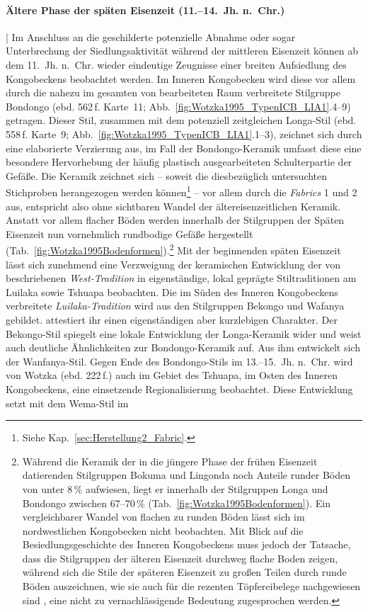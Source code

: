 \paragraph{Ältere Phase der späten Eisenzeit (11.--14.~Jh. n.~Chr.)}\hspace{-.5em}|\hspace{.5em}%
Im Anschluss an die geschilderte potenzielle Abnahme oder sogar Unterbrechung der Siedlungsaktivität während der mittleren Eisenzeit können ab dem 11.~Jh. n.~Chr. wieder eindeutige Zeugnisse einer breiten Aufsiedlung des Kongobeckens beobachtet werden. Im Inneren Kongobecken wird diese vor allem durch die nahezu im gesamten von \textcite{Wotzka.1995} bearbeiteten Raum verbreitete Stilgruppe Bondongo (ebd. 562\,f. Karte~11; Abb.~\ref{fig:Wotzka1995_TypenICB_LIA1}.4--9) getragen. Dieser Stil, zusammen mit dem potenziell zeitgleichen Longa-Stil (ebd. 558\,f. Karte~9; Abb.~\ref{fig:Wotzka1995_TypenICB_LIA1}.1--3), zeichnet sich durch eine elaborierte Verzierung aus, im Fall der Bondongo-Keramik umfasst diese eine besondere Hervorhebung der häufig plastisch ausgearbeiteten Schulterpartie der Gefäße. Die Keramik zeichnet sich -- soweit die diesbezüglich untersuchten Stichproben herangezogen werden können\footnote{Siehe Kap.~\ref{sec:Herstellung2_Fabric}.} -- vor allem durch die \textit{Fabrics} 1 und 2 aus, entspricht also ohne sichtbaren Wandel der ältereisenzeitlichen Keramik. Anstatt vor allem flacher Böden werden innerhalb der Stilgruppen der Späten Eisenzeit nun vornehmlich rundbodige Gefäße hergestellt (Tab.~\ref{fig:Wotzka1995Bodenformen}).\footnote{Während die Keramik der in die jüngere Phase der frühen Eisenzeit datierenden Stilgruppen Bokuma und Lingonda noch Anteile runder Böden von unter 8\,\% aufwiesen, liegt er innerhalb der Stilgruppen Longa und Bondongo zwischen 67--70\,\% (Tab.~\ref{fig:Wotzka1995Bodenformen}). Ein vergleichbarer Wandel von flachen zu runden Böden lässt sich im nordwestlichen Kongobecken nicht beobachten. Mit Blick auf die Besiedlungsgeschichte des Inneren Kongobeckens muss jedoch der Tatsache, dass die Stilgruppen der älteren Eisenzeit durchweg flache Boden zeigen, während sich die Stile der späteren Eisenzeit zu großen Teilen durch runde Böden auszeichnen, wie sie auch für die rezenten Töpfereibelege nachgewiesen sind \parencite{Eggert.1980c}, eine nicht zu vernachlässigende Bedeutung zugesprochen werden.} Mit der beginnenden späten Eisenzeit lässt sich zunehmend eine Verzweigung der keramischen Entwicklung der von \textcite[221--223]{Wotzka.1995} beschriebenen \textit{West-Tradition} in eigenständige, lokal geprägte Stiltraditionen am Luilaka sowie Tshuapa beobachten. Die im Süden des Inneren Kongobeckens verbreitete \textit{Luilaka-Tradition} wird aus den Stilgruppen Bekongo und Wafanya gebildet. \textcite{Wotzka.1995} attestiert ihr einen eigenständigen aber kurzlebigen Charakter. Der Bekongo-Stil spiegelt eine lokale Entwicklung der Longa-Keramik wider und weist auch deutliche Ähnlichkeiten zur Bondongo-Keramik auf. Aus ihm entwickelt sich der Wanfanya-Stil. Gegen Ende des Bondongo-Stils im 13.--15.~Jh. n.~Chr. wird von Wotzka (ebd. 222\,f.) auch im Gebiet des Tshuapa, im Osten des Inneren Kongobeckens, eine einsetzende Regionalisierung beobachtet. Diese Entwicklung setzt mit dem Wema-Stil im 